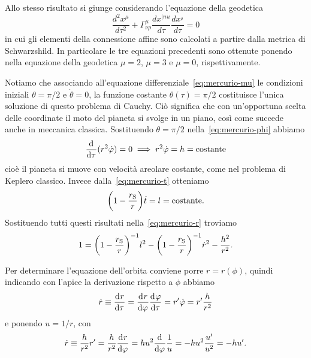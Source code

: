 Allo stesso risultato si giunge considerando l'equazione della geodetica
\begin{equation}
\frac{d^2 x^{\mu}}{d\tau^2}+\Gamma^{\mu}_{\nu\rho}\frac{dx^{|nu}}{d\tau}
\frac{d x^{_\rho}}{d \tau} = 0
\end{equation}
in cui gli elementi della connessione affine sono calcolati a partire dalla
metrica di Schwarzshild. In particolare le tre equazioni precedenti sono
ottenute ponendo nella equazione della geodetica $\mu=2$, $\mu=3$ e $\mu=0$,
rispettivamente.

Notiamo che associando all'equazione differenziale~\eqref{eq:mercurio-mu} le
condizioni iniziali $\theta = \pi/2$ e $\dot{\theta} = 0$, la funzione costante
$\theta(\tau) = \pi/2$ costituisce l'unica soluzione di questo problema di
Cauchy.  Ciò significa che con un'opportuna scelta delle coordinate il moto del
pianeta si svolge in un piano, così come succede anche in meccanica classica.
Sostituendo $\theta = \pi/2$ nella~\eqref{eq:mercurio-phi} abbiamo
\begin{equation}
  \label{eq:mercurio-phi2}
  \frac{{\mathop{}\!\mathrm{d}^{}}}{\mathop{}\!\mathrm{d} {\tau}^{}}(r^{2}\dot{\varphi}) = 0 \implies r^{2}\dot{\varphi} = h =
  \text{costante}
\end{equation}
cioè il pianeta si muove con velocità areolare costante, come nel problema di
Keplero classico.  Invece dalla~\eqref{eq:mercurio-t} otteniamo
\begin{equation}
  \label{eq:mercurio-t2}
  \bigg(1 - \frac{r_{\textup{S}}}{r}\bigg)\dot{t} = l = \text{costante}.
\end{equation}
Sostituendo tutti questi risultati nella~\eqref{eq:mercurio-r} troviamo
\begin{equation}
  \label{eq:mercurio-r2}
  1 = \bigg(1 - \frac{r_{\textup{S}}}{r}\bigg)^{-1}l^{2} - \bigg(1 -
  \frac{r_{\textup{S}}}{r}\bigg)^{-1}\dot{r}^{2} - \frac{h^{2}}{r^{2}}.
\end{equation}

Per determinare l'equazione dell'orbita conviene porre
$r = r(\phi)$, quindi indicando con l'apice la derivazione rispetto a
$\phi$ abbiamo
\begin{equation}
  \dot{r} \equiv  \frac{{\mathop{}\!\mathrm{d}^{}}r}{\mathop{}\!\mathrm{d} {\tau}^{}} = \frac{{\mathop{}\!\mathrm{d}^{}}r}{\mathop{}\!\mathrm{d} {\varphi}^{}} \frac{{\mathop{}\!\mathrm{d}^{}}\varphi}{\mathop{}\!\mathrm{d} {\tau}^{}} = r'
  \dot{\varphi} = r' \frac{h}{r^{2}}
\end{equation}
e ponendo $u = 1/r$, con
\begin{equation}
  \dot{r} \equiv \frac{h}{r^{2}}r' = \frac{h}{r^{2}}\frac{{\mathop{}\!\mathrm{d}^{}}r}{\mathop{}\!\mathrm{d} {\varphi}^{}} =
  hu^{2}\frac{{\mathop{}\!\mathrm{d}^{}}}{\mathop{}\!\mathrm{d} {\varphi}^{}} \frac{1}{u} = -hu^{2}\frac{u'}{u^{2}} = -hu'.
\end{equation}

